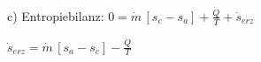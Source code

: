 c) Entropiebilanz:  
\( 0 = \dot{m} \, [s_c - s_a] + \frac{\dot{Q}}{T} + \dot{s}_{erz} \)  

\( \dot{s}_{erz} = \dot{m} \, [s_a - s_c] - \frac{\dot{Q}}{T} \)